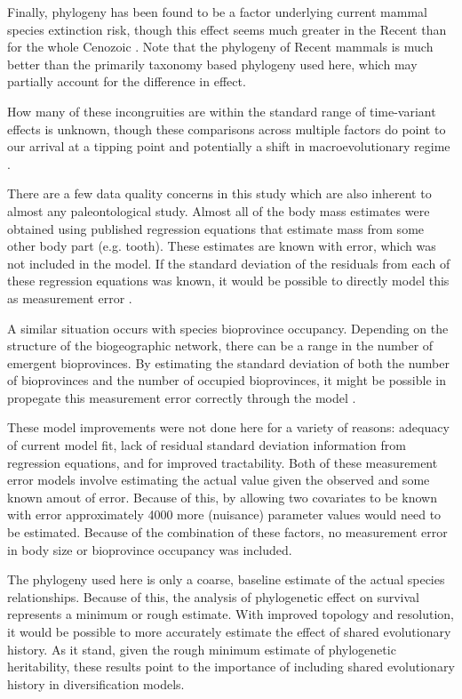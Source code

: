 \documentclass[12pt,letterpaper]{article}
\begin{document}
Finally, phylogeny has been found to be a factor underlying current mammal species extinction risk, though this effect seems much greater in the Recent than for the whole Cenozoic \citep{Fritz2010b}. Note that the phylogeny of Recent mammals is much better than the primarily taxonomy based phylogeny used here, which may partially account for the difference in effect.

How many of these incongruities are within the standard range of time-variant effects is unknown, though these comparisons across multiple factors do point to our arrival at a tipping point \citep{Barnosky2012a,Barnosky2011} and potentially a shift in macroevolutionary regime \citep{Jablonski1986}.


There are a few data quality concerns in this study which are also inherent to almost any paleontological study. Almost all of the body mass estimates were obtained using published regression equations that estimate mass from some other body part (e.g. tooth). These estimates are known with error, which was not included in the model. If the standard deviation of the residuals from each of these regression equations was known, it would be possible to directly model this as measurement error \citep{Gelman2013d}. 

A similar situation occurs with species bioprovince occupancy. Depending on the structure of the biogeographic network, there can be a range in the number of emergent bioprovinces. By estimating the standard deviation of both the number of bioprovinces and the number of occupied bioprovinces, it might be possible in propegate this measurement error correctly through the model \citep{Gelman2013d}. 

These model improvements were not done here for a variety of reasons: adequacy of current model fit, lack of residual standard deviation information from regression equations, and for improved tractability. Both of these measurement error models involve estimating the actual value given the observed and some known amout of error. Because of this, by allowing two covariates to be known with error approximately 4000 more (nuisance) parameter values would need to be estimated. Because of the combination of these factors, no measurement error in body size or bioprovince occupancy was included.

The phylogeny used here is only a coarse, baseline estimate of the actual species relationships. Because of this, the analysis of phylogenetic effect on survival represents a minimum or rough estimate. With improved topology and resolution, it would be possible to more accurately estimate the effect of shared evolutionary history. As it stand, given the rough minimum estimate of phylogenetic heritability, these results point to the importance of including shared evolutionary history in diversification models.
\end{document}
